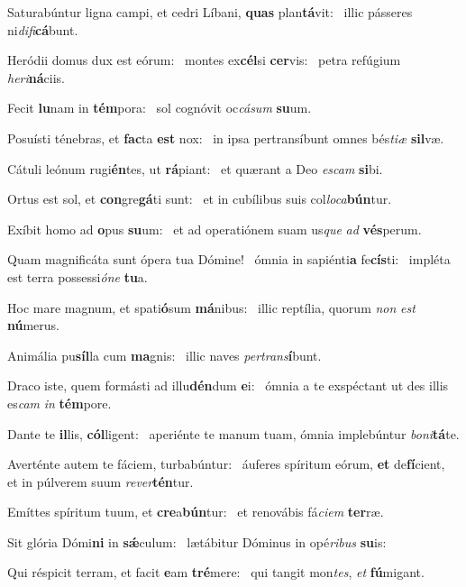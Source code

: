 \item Saturabúntur ligna campi, et cedri Líbani, \textbf{quas} plan\textbf{tá}vit:~\psstar{} illic pásseres ni\textit{difi}\textbf{cá}bunt.
\item Heródii domus dux est eórum:~\pscross{} montes ex\textbf{cél}si \textbf{cer}vis:~\psstar{} petra refúgium \textit{heri}\textbf{ná}ciis.
\item Fecit \textbf{lu}nam in \textbf{tém}pora:~\psstar{} sol cognóvit oc\textit{cásum} \textbf{su}um.
\item Posuísti ténebras, et \textbf{fac}ta \textbf{est} nox:~\psstar{} in ipsa pertransíbunt omnes bés\textit{tiæ} \textbf{sil}væ.
\item Cátuli leónum rugi\textbf{én}tes, ut \textbf{rá}piant:~\psstar{} et quærant a Deo \textit{escam} \textbf{si}bi.
\item Ortus est sol, et \textbf{con}gre\textbf{gá}ti sunt:~\psstar{} et in cubílibus suis col\textit{loca}\textbf{bún}tur.
\item Exíbit homo ad \textbf{o}pus \textbf{su}um:~\psstar{} et ad operatiónem suam us\textit{que} \textit{ad} \textbf{vés}perum.
\item Quam magnificáta sunt ópera tua Dómine!~\pscross{} ómnia in sapiénti\textbf{a} fe\textbf{cís}ti:~\psstar{} impléta est terra possessi\textit{óne} \textbf{tu}a.
\item Hoc mare magnum, et spati\textbf{ó}sum \textbf{má}nibus:~\psstar{} illic reptília, quorum \textit{non} \textit{est} \textbf{nú}merus.
\item Animália pu\textbf{síl}la cum \textbf{ma}gnis:~\psstar{} illic naves \textit{pertrans}\textbf{í}bunt.
\item Draco iste, quem formásti ad illu\textbf{dén}dum \textbf{e}i:~\psstar{} ómnia a te exspéctant ut des illis es\textit{cam} \textit{in} \textbf{tém}pore.
\item Dante te \textbf{il}lis, \textbf{cól}ligent:~\psstar{} aperiénte te manum tuam, ómnia implebúntur \textit{boni}\textbf{tá}te.
\item Averténte autem te fáciem, turbabúntur:~\pscross{} áuferes spíritum eórum, \textbf{et} de\textbf{fí}cient,~\psstar{} et in púlverem suum \textit{rever}\textbf{tén}tur.
\item Emíttes spíritum tuum, et \textbf{cre}a\textbf{bún}tur:~\psstar{} et renovábis fá\textit{ciem} \textbf{ter}ræ.
\item Sit glória Dómi\textbf{ni} in \textbf{sǽ}culum:~\psstar{} lætábitur Dóminus in opé\textit{ribus} \textbf{su}is:
\item Qui réspicit terram, et facit \textbf{e}am \textbf{tré}mere:~\psstar{} qui tangit mon\textit{tes}, \textit{et} \textbf{fú}migant.
